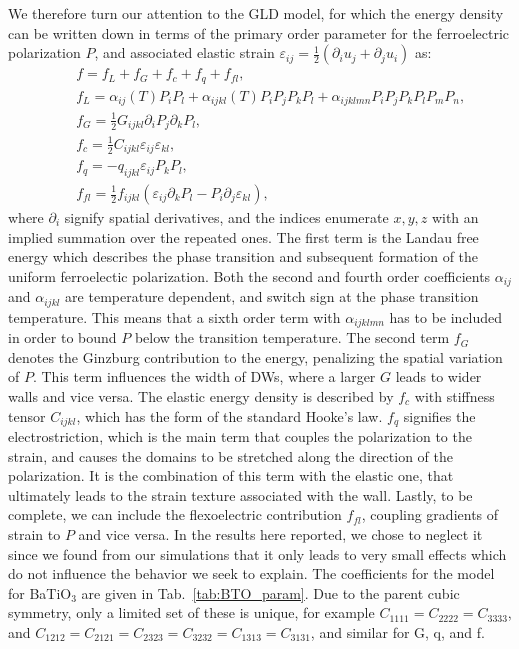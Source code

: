 We therefore turn our attention to the GLD model, for which the energy density can be written down in terms of the primary order parameter for the ferroelectric polarization $P$, and associated elastic strain $\varepsilon_{ij} = \frac{1}{2}(\partial_i u_j + \partial_j u_i)$ as:
\begin{eqnarray}\label{eq:BTO_energy}
&&f = f_{L}+f_{G}+f_{c}+f_{q}+f_{fl},\\
&&f_{L} = \alpha_{ij}(T)P_iP_l + \alpha_{ijkl}(T)P_{i}P_{j}P_{k}P_{l} + \alpha_{ijklmn} P_i P_j P_k P_l P_m P_n,\\
&&f_{G} = \frac{1}{2}G_{ijkl}\partial_i P_j\partial_k P_l,\\
&&f_{c} = \frac{1}{2}C_{ijkl}\varepsilon_{ij}\varepsilon_{kl},\\
&&f_{q}= - q_{ijkl}\varepsilon_{ij}P_{k}P_{l},\label{eq:qpp}\\
&&f_{fl}=\frac{1}{2}f_{ijkl}(\varepsilon_{ij}\partial_k P_l - P_i\partial_j\varepsilon_{kl}),
\end{eqnarray}
where $\partial_i$ signify spatial derivatives, and the indices enumerate ${x,y,z}$ with an implied summation over the repeated ones.
The first term is the Landau free energy which describes the phase transition and subsequent formation of the uniform ferroelectic polarization.
Both the second and fourth order coefficients $\alpha_{ij}$ and $\alpha_{ijkl}$ are temperature dependent, and switch sign at the phase transition temperature.
This means that a sixth order term with $\alpha_{ijklmn}$ has to be included in order to bound $P$ below the transition temperature.
The second term $f_G$ denotes the Ginzburg contribution to the energy, penalizing the spatial variation of $P$.  
This term influences the width of DWs, where a larger $G$ leads to wider walls and vice versa.
The elastic energy density is described by $f_c$ with stiffness tensor $C_{ijkl}$, which has the form of the standard Hooke's law.
$f_q$ signifies the electrostriction, which is the main term that couples the polarization to the strain, and causes the domains to be stretched along the direction of the polarization.
It is the combination of this term with the elastic one, that ultimately leads to the strain texture associated with the wall.
Lastly, to be complete, we can include the flexoelectric contribution $f_{fl}$, coupling gradients of strain to $P$ and vice versa.
In the results here reported, we chose to neglect it since we found from our simulations that it only leads to very small effects which do not influence the behavior we seek to explain.
The coefficients for the model for BaTiO$_3$ are given in Tab.~\ref{tab:BTO_param}.
Due to the parent cubic symmetry, only a limited set of these is unique, for example $C_{1111} = C_{2222} = C_{3333}$, and $C_{1212} = C_{2121} = C_{2323} = C_{3232} = C_{1313} = C_{3131}$, and similar for G, q, and f. 

